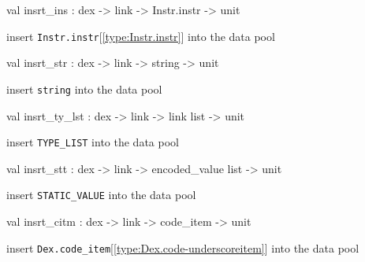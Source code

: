 \documentclass[11pt]{article}
\begin{document}
\label{val:Dex.insrt-underscoreins}\begin{ocamldoccode}
val insrt_ins : dex -> link -> Instr.instr -> unit
\end{ocamldoccode}
\begin{ocamldocdescription}
insert {\tt{Instr.instr}}[\ref{type:Instr.instr}] into the data pool


\end{ocamldocdescription}




\label{val:Dex.insrt-underscorestr}\begin{ocamldoccode}
val insrt_str : dex -> link -> string -> unit
\end{ocamldoccode}
\begin{ocamldocdescription}
insert {\tt{string}} into the data pool


\end{ocamldocdescription}




\label{val:Dex.insrt-underscorety-underscorelst}\begin{ocamldoccode}
val insrt_ty_lst : dex -> link -> link list -> unit
\end{ocamldoccode}
\begin{ocamldocdescription}
insert {\tt{TYPE\_LIST}} into the data pool


\end{ocamldocdescription}




\label{val:Dex.insrt-underscorestt}\begin{ocamldoccode}
val insrt_stt : dex -> link -> encoded_value list -> unit
\end{ocamldoccode}
\begin{ocamldocdescription}
insert {\tt{STATIC\_VALUE}} into the data pool


\end{ocamldocdescription}




\label{val:Dex.insrt-underscorecitm}\begin{ocamldoccode}
val insrt_citm : dex -> link -> code_item -> unit
\end{ocamldoccode}
\begin{ocamldocdescription}
insert {\tt{Dex.code\_item}}[\ref{type:Dex.code-underscoreitem}] into the data pool


\end{ocamldocdescription}
\end{document}
